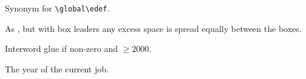 \begin{glossinventory}
\item [\cs{xdef}]
      Synonym for \verb-\global\edef-.

\item [\cs{xleaders}]
      As , but with box leaders any excess space is 
      spread equally between the boxes.

\item [\cs{xspaceskip}]
      Interword glue if non-zero and ${}\geq2000$.

\item [\cs{year}]
      The year of the current job.
\end{glossinventory}
